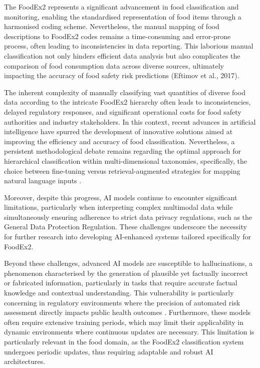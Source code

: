 The FoodEx2 represents a significant advancement in food classification and monitoring, enabling the standardised representation of food items through a harmonised coding scheme. Nevertheless, the manual mapping of food descriptions to FoodEx2 codes remains a time-consuming and error-prone process, often leading to inconsistencies in data reporting. This laborious manual classification not only hinders efficient data analysis but also complicates the comparison of food consumption data across diverse sources, ultimately impacting the accuracy of food safety risk predictions (Eftimov et al., 2017).

The inherent complexity of manually classifying vast quantities of diverse food data according to the intricate FoodEx2 hierarchy often leads to inconsistencies, delayed regulatory responses, and significant operational costs for food safety authorities and industry stakeholders. In this context, recent advances in artificial intelligence have spurred the development of innovative solutions aimed at improving the efficiency and accuracy of food classification. Nevertheless, a persistent methodological debate remains regarding the optimal approach for hierarchical classification within multi-dimensional taxonomies, specifically, the choice between fine-tuning versus retrieval-augmented strategies for mapping natural language inputs \parencite{lorenzo_molfetta_47d7c4cd}.

Moreover, despite this progress, AI models continue to encounter significant limitations, particularly when interpreting complex multimodal data while simultaneously ensuring adherence to strict data privacy regulations, such as the General Data Protection Regulation. These challenges underscore the necessity for further research into developing AI-enhanced systems tailored specifically for FoodEx2.

Beyond these challenges, advanced AI models are susceptible to hallucinations, a phenomenon characterised by the generation of plausible yet factually incorrect or fabricated information, particularly in tasks that require accurate factual knowledge and contextual understanding. This vulnerability is particularly concerning in regulatory environments where the precision of automated risk assessment directly impacts public health outcomes \parencite{omer_faruk_sari_c479eead}. Furthermore, these models often require extensive training periods, which may limit their applicability in dynamic environments where continuous updates are necessary. This limitation is particularly relevant in the food domain, as the FoodEx2 classification system undergoes periodic updates, thus requiring adaptable and robust AI architectures.

